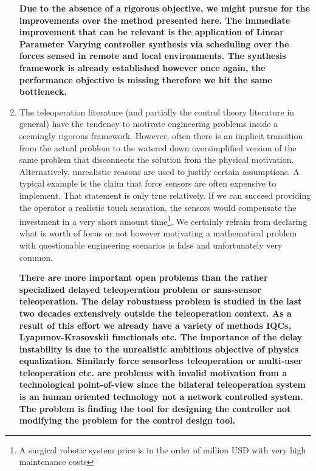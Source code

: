 \begin{enumerate}
    {\bfseries Due to the absence of a rigorous objective, we might pursue for the improvements over the method presented here. The 
    immediate improvement that can be relevant is the application of Linear Parameter Varying controller synthesis via scheduling over the 
    forces sensed in remote and local environments. The synthesis framework is already established however once again, the performance 
    objective is missing therefore we hit the same bottleneck. 
    }
    \item The teleoperation literature (and partially the control theory literature in general) have the tendency to motivate engineering 
    problems inside a seemingly rigorous framework. However, often there is an implicit transition from the actual problem to the watered 
    down oversimplified version of the same problem that disconnects the solution from the physical motivation. Alternatively, unrealistic 
    reasons are used to justify certain assumptions. A typical example is the claim that force sensors are often expensive to implement. That 
    statement is only true relatively. If we can succeed providing the operator a realistic touch sensation, the sensors would compensate the
    investment in a very short amount time\footnote{A surgical robotic system price is in the order of million USD with very high maintenance 
    costs}. We certainly refrain from declaring what is worth of focus or not however motivating a mathematical problem with questionable
    engineering scenarios is false and unfortunately very common. 
    
    {\bfseries There are more important open problems than the rather specialized delayed teleoperation problem or sans-sensor teleoperation.
    The delay robustness problem is studied in the last two decades extensively outside the teleoperation context. As a result of this 
    effort we already have a variety of methods IQCs, Lyapunov-Krasovskii functionals etc. The importance of the delay instability is due 
    to the unrealistic ambitious objective of physics equalization. Similarly force sensorless teleoperation or multi-user teleoperation etc.
    are problems with invalid motivation from a technological point-of-view since the bilateral teleoperation system is an human oriented
    technology not a network controlled system. The problem is finding the tool for designing the controller not modifying the problem 
    for the control design tool.
    }
    
\end{enumerate}


